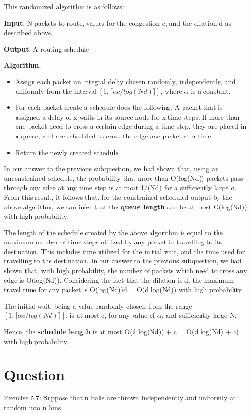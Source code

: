 \documentclass[10pt]{article}
\begin{document}
This randomized algorithm is as follows:

\textbf{Input}: N packets to route, values for the congestion c, and the dilation d as described above.

\textbf{Output}: A routing schedule

\textbf{Algorithm}:
\begin{itemize}
\item Assign each packet an integral delay chosen randomly, independently, and uniformly from the interval $[1, \lceil \alpha c/log(Nd)\rceil]$, where $\alpha$ is a constant.
\item For each packet create a schedule does the following:
\subitem A packet that is assigned a delay of x waits in its source node for x time steps.
\subitem If more than one packet need to cross a certain edge during a time-step, they are placed in a queue, and are scheduled to cross the edge one packet at a time.
\item Return the newly created schedule.
\end{itemize}

In our answer to the previous subquestion, we had shown that, using an unconstrained schedule, the probability that more than O(log(Nd)) packets pass through any edge at any time step is at most 1/(Nd) for a sufficiently large $\alpha$. From this result, it follows that, for the constrained scheduled output by the above algorithm, we can infer that the \textbf{queue length} can be at most O(log(Nd)) with high probability.

The length of the schedule created by the above algorithm is equal to the maximum number of time steps utilized by any packet in travelling to its destination. This includes time utilized for the initial wait, and the time used for travelling to the destination. In our answer to the previous subquestion, we had shown that, with high probability, the number of packets which need to cross any edge is O(log(Nd)). Considering the fact that the dilation is d, the maximum travel time for any packet is O(log(Nd))d = O(d log(Nd)) with high probability.

The initial wait, being a value randomly chosen from the range \\
$[1, \lceil \alpha c/log(Nd)\rceil]$, is at most c, for any value of $\alpha$, and sufficiently large N.

Hence, the \textbf{schedule length} is at most O(d log(Nd)) + c = O(d log(Nd) + c) with high probability.

\section{Question}
Exercise 5.7: Suppose that n balls are thrown independently and uniformly at random into n bins.
\end{document}
